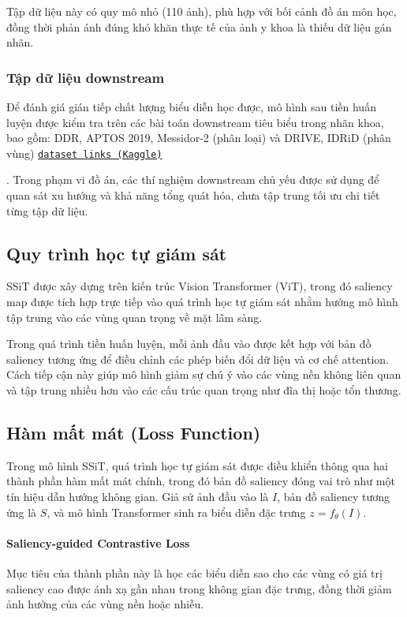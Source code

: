 Tập dữ liệu này có quy mô nhỏ (110 ảnh), phù hợp với bối cảnh đồ án môn học, đồng thời phản ánh đúng khó khăn thực tế của ảnh y khoa là thiếu dữ liệu gán nhãn.

\subsubsection{Tập dữ liệu downstream}

Để đánh giá gián tiếp chất lượng biểu diễn học được, mô hình sau tiền huấn luyện được kiểm tra trên các bài toán downstream tiêu biểu trong nhãn khoa, bao gồm:
DDR, APTOS 2019, Messidor-2 (phân loại) và DRIVE, IDRiD (phân vùng)
\href{https://www.kaggle.com/datasets/ascanipek/eyepacs-aptos-messidor-diabetic-retinopathy}{\texttt{dataset links (Kaggle)}}

. Trong phạm vi đồ án, các thí nghiệm downstream chủ yếu được sử dụng để quan sát xu hướng và khả năng tổng quát hóa, chưa tập trung tối ưu chi tiết từng tập dữ liệu.

\subsection{Quy trình học tự giám sát}

SSiT được xây dựng trên kiến trúc Vision Transformer (ViT), trong đó saliency map được tích hợp trực tiếp vào quá trình học tự giám sát nhằm hướng mô hình tập trung vào các vùng quan trọng về mặt lâm sàng.

Trong quá trình tiền huấn luyện, mỗi ảnh đầu vào được kết hợp với bản đồ saliency tương ứng để điều chỉnh các phép biến đổi dữ liệu và cơ chế attention. Cách tiếp cận này giúp mô hình giảm sự chú ý vào các vùng nền không liên quan và tập trung nhiều hơn vào các cấu trúc quan trọng như đĩa thị hoặc tổn thương.

\subsection{Hàm mất mát (Loss Function)}

Trong mô hình SSiT, quá trình học tự giám sát được điều khiển thông qua hai thành phần hàm mất mát chính, trong đó bản đồ saliency đóng vai trò như một tín hiệu dẫn hướng không gian. Giả sử ảnh đầu vào là $I$, bản đồ saliency tương ứng là $S$, và mô hình Transformer sinh ra biểu diễn đặc trưng $z = f_\theta(I)$.

\paragraph{Saliency-guided Contrastive Loss}
Mục tiêu của thành phần này là học các biểu diễn sao cho các vùng có giá trị saliency cao được ánh xạ gần nhau trong không gian đặc trưng, đồng thời giảm ảnh hưởng của các vùng nền hoặc nhiễu. 

